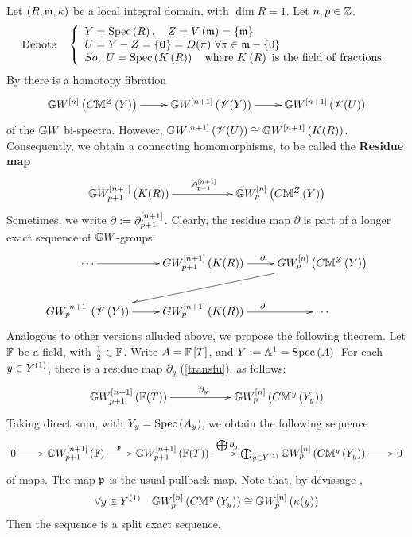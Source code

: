 \documentclass[12pt]{article}
\begin{document}
\bD\label{defResidue}{\rm 
Let $\LRf{R, \m, \kappa}$ be a local integral domain, with $\dim R=1$. Let $n, p\in {\BZ}$.
$$
{\rm Denote} 
\quad 
\LBrace{{l}
Y =\spec{R}, \quad
Z=V\LRf{\m}=\LRs{\m}\\
U =Y-Z=\LRs{{\bf 0}}=D(\pi)~\forall \pi \in \m-\LRs{0}\\
So, ~U=\spec{K\LRf{R}}\quad {\rm where}~ K\LRf{R}~{\rm is~the~field~of~fractions.}\\
} 
$$
 By \cite[Thm 5.6]{M25l} there is a homotopy fibration 
$$
\diagram 
{\BG}W^{\LRt{n}}\LRf{C{\BM}^Z\LRf{Y}} \ar[r] & {\BG}W^{\LRt{n+1}}\LRf{{\SV}(Y)} \ar[r] & {\BG}W^{\LRt{n+1}}\LRf{{\SV}(U)} \\
\enddiagram 
$$
of the ${\BG}W$ bi-spectra. However, ${\BG}W^{\LRt{n+1}}\LRf{{\SV}(U)}\cong {\BG}W^{\LRt{n+1}}\LRf{K(R)}$.
Consequently, we obtain a connecting homomorphisms, to be called the {\bf Residue  map} 
\begin{equation}\label{transfu}
\diagram 
{\BG}W_{p+1}^{\LRt{n+1}}\LRf{K(R)} \ar[rr]^{\partial^{\LRt{n+1}}_{p+1}} && {\BG}W^{\LRt{n}}_p\LRf{C{\BM}^Z\LRf{Y}} 
\enddiagram 
\end{equation}
Sometimes, we write $\partial:=\partial^{\LRt{n+1}}_{p+1}$.
}
\eD
%
  Clearly, the residue map $\partial$ is part of a longer exact sequence of ${\BG}W$-groups:
\begin{equation}\label{TaruFaru}
\diagram 
% 
\cdots \ar[r] & 
GW^{\LRt{n+1}}_{p+1}\LRf{K(R)} \ar[r]^{\partial} & GW^{\LRt{n}}_{p}\LRf{C{\BM}^Z\LRf{Y}} \ar[dll]\\
GW^{\LRt{n+1}}_{p}\LRf{{\SV}\LRf{Y}} \ar[r] & 
GW^{\LRt{n+1}}_{p}\LRf{K(R)} \ar[r]^{\partial} & \cdots \\ %
\enddiagram 
\end{equation}
%
Analogous to other versions alluded above, we propose the following theorem. 
%
\bT\label{arrowticExactAll} {\rm 
Let ${\BF}$ be a field, with $\frac{1}{2}\in {\BF}$. Write $A={\BF}\LRt{T}$, and $Y:={\BA}^1=\spec{A}$.  For each $y\in Y^{\LRf{1}}$, there is a residue map $\partial_y$  (\ref{transfu}), as follows:
$$
\diagram
{\BG}W^{\LRt{n+1}}_{p+1}\LRf{{\BF}(T)} \ar[rr]^{\partial_y}  &&  
{\BG}W^{\LRt{n}}_{p}\LRf{C{\BM}^y\LRf{Y_y}} \\
\enddiagram
$$ 
%
 Taking direct sum, with $Y_y=\spec{A_y}$, we obtain the following sequence
\begin{equation}\label{primeSeq}
\diagram
0\ar[r] &
{\BG}W^{\LRt{n+1}}_{p+1}\LRf{{\BF}} \ar[r]^{\p\quad} &
{\BG}W^{\LRt{n+1}}_{p+1}\LRf{{\BF}(T)} \ar[r]^{\bigoplus \partial_y\qquad }  & \bigoplus_{y\in Y^{\LRf{1}}}
{\BG}W^{\LRt{n}}_{p}\LRf{C{\BM}^y\LRf{Y_y}}\ar[r] &0 \\
\enddiagram 
\end{equation}  
of maps. 
The map $\p$ is the usual pullback map. Note that, by d\'{e}vissage \cite[Thm 6.1]{M25}, 
\begin{equation}\label{alsoDfme}
\forall y\in Y^{\LRf{1}} \quad {\BG}W^{\LRt{n}}_{p}\LRf{C{\BM}^y\LRf{Y_y}} \cong 
{\BG}W^{\LRt{n}}_{p}\LRf{\kappa(y)}
\end{equation}
Then the sequence is a split exact sequence.
}
\end{document}
